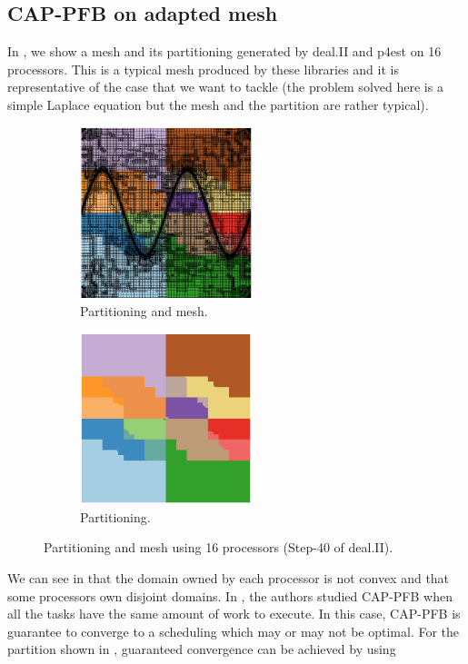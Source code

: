 \documentclass[letterpaper]{article}
\renewcommand{\(}{\left(}
\renewcommand{\)}{\right)}
\renewcommand{\[}{\left[}
\renewcommand{\]}{\right]}
\begin{document}
\subsection{CAP-PFB on adapted mesh}
In , we show a mesh and its partitioning generated by deal.II and p4est 
on 16 processors. This is a typical mesh produced by these libraries and it is
representative of the case that we want to tackle (the problem solved here is a
simple Laplace equation but the mesh and the partition are rather typical). 
\begin{figure}[H]
  \begin{subfigure}[b]{.5\textwidth}
    \centering
    \includegraphics[width=5cm]{subdomain_id_0}
    \caption{Partitioning and mesh.}
  \end{subfigure}
  \begin{subfigure}[b]{.5\textwidth}
    \centering
    \includegraphics[width=5cm]{subdomain_id_1}
    \caption{Partitioning.}
  \end{subfigure}
  \caption{Partitioning and mesh using 16 processors (Step-40 of deal.II).}
  \label{subdomain_id}
\end{figure}
We can see in  that the domain owned by each processor is not
convex and that some
processors own disjoint domains. In \cite{Mo2014}, the authors studied CAP-PFB
when all the tasks have the same amount of work to execute. In this case,
CAP-PFB is guarantee to converge to a scheduling which may or may not be
optimal. For the partition shown in , guaranteed convergence can be achieved by using
\end{document}
